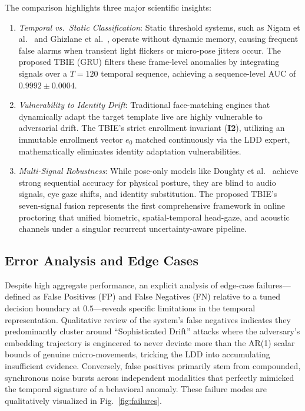 \documentclass[journal]{IEEEtran}
\begin{document}
The comparison highlights three major scientific insights:
\begin{enumerate}
    \item \emph{Temporal vs.\ Static Classification}: Static threshold systems, such as Nigam et al.~\cite{Nigam2020} and Ghizlane et al.~\cite{Ghizlane2019}, operate without dynamic memory, causing frequent false alarms when transient light flickers or micro-pose jitters occur. The proposed TBIE (GRU) filters these frame-level anomalies by integrating signals over a $T=120$ temporal sequence, achieving a sequence-level AUC of $0.9992 \pm 0.0004$.
    \item \emph{Vulnerability to Identity Drift}: Traditional face-matching engines that dynamically adapt the target template live are highly vulnerable to adversarial drift. The TBIE's strict enrollment invariant (\textbf{I2}), utilizing an immutable enrollment vector $e_0$ matched continuously via the LDD expert, mathematically eliminates identity adaptation vulnerabilities.
    \item \emph{Multi-Signal Robustness}: While pose-only models like Doughty et al.~\cite{Doughty2022} achieve strong sequential accuracy for physical posture, they are blind to audio signals, eye gaze shifts, and identity substitution. The proposed TBIE's seven-signal fusion represents the first comprehensive framework in online proctoring that unified biometric, spatial-temporal head-gaze, and acoustic channels under a singular recurrent uncertainty-aware pipeline.
\end{enumerate}

\subsection{Error Analysis and Edge Cases}

Despite high aggregate performance, an explicit analysis of edge-case failures---defined as False Positives (FP) and False Negatives (FN) relative to a tuned decision boundary at $0.5$---reveals specific limitations in the temporal representation. Qualitative review of the system's false negatives indicates they predominantly cluster around ``Sophisticated Drift'' attacks where the adversary's embedding trajectory is engineered to never deviate more than the AR(1) scalar bounds of genuine micro-movements, tricking the LDD into accumulating insufficient evidence. Conversely, false positives primarily stem from compounded, synchronous noise bursts across independent modalities that perfectly mimicked the temporal signature of a behavioral anomaly. These failure modes are qualitatively visualized in Fig.~\ref{fig:failures}.
\end{document}
